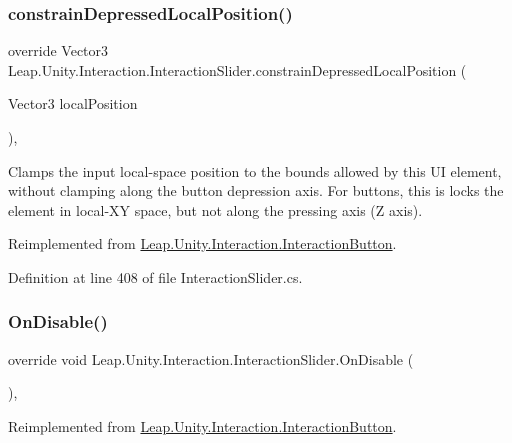 \subsubsection{\texorpdfstring{constrainDepressedLocalPosition()}{constrainDepressedLocalPosition()}}
{\footnotesize\ttfamily override Vector3 Leap.\+Unity.\+Interaction.\+Interaction\+Slider.\+constrain\+Depressed\+Local\+Position (\begin{DoxyParamCaption}\item[{Vector3}]{local\+Position }\end{DoxyParamCaption})\hspace{0.3cm}{\ttfamily [protected]}, {\ttfamily [virtual]}}



Clamps the input local-\/space position to the bounds allowed by this UI element, without clamping along the button depression axis. For buttons, this is locks the element in local-\/\+XY space, but not along the pressing axis (Z axis). 



Reimplemented from \mbox{\hyperlink{class_leap_1_1_unity_1_1_interaction_1_1_interaction_button_a8e073f9ac38439194d9b96de35362eca}{Leap.\+Unity.\+Interaction.\+Interaction\+Button}}.



Definition at line 408 of file Interaction\+Slider.\+cs.

\mbox{\label{class_leap_1_1_unity_1_1_interaction_1_1_interaction_slider_ab466b7324c426f9a77797130729ca9a6}} 
\subsubsection{\texorpdfstring{OnDisable()}{OnDisable()}}
{\footnotesize\ttfamily override void Leap.\+Unity.\+Interaction.\+Interaction\+Slider.\+On\+Disable (\begin{DoxyParamCaption}{ }\end{DoxyParamCaption})\hspace{0.3cm}{\ttfamily [protected]}, {\ttfamily [virtual]}}



Reimplemented from \mbox{\hyperlink{class_leap_1_1_unity_1_1_interaction_1_1_interaction_button_a678babacbcc3d91d865ea76462a30aec}{Leap.\+Unity.\+Interaction.\+Interaction\+Button}}.




